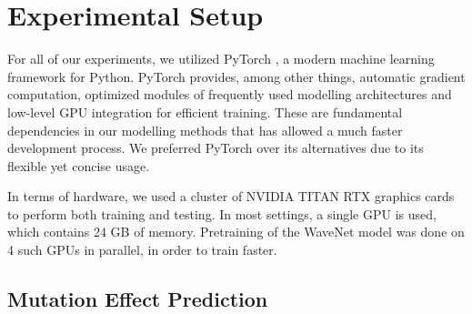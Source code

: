 
\section{Experimental Setup}
\label{sec:experimental_setup}
For all of our experiments, we utilized PyTorch \cite{NEURIPS2019_9015}, a modern machine learning framework for Python. PyTorch provides, among other things, automatic gradient computation, optimized modules of frequently used modelling architectures and low-level GPU integration for efficient training. These are fundamental dependencies in our modelling methods that has allowed a much faster development process. We preferred PyTorch over its alternatives due to its flexible yet concise usage.

In terms of hardware, we used a cluster of NVIDIA TITAN RTX graphics cards to perform both training and testing. In most settings, a single GPU is used, which contains 24 GB of memory. Pretraining of the WaveNet model was done on 4 such GPUs in parallel, in order to train faster.

\subsection{Mutation Effect Prediction}
\label{sec:mutation_effect_prediction}


